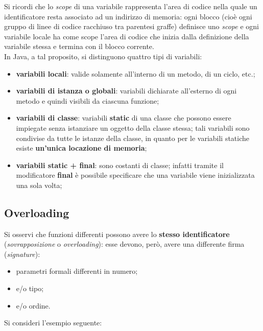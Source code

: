 \documentclass[a4paper]{extarticle}
\begin{document}
\vspace{1em}
\noindent
Si ricordi che lo \emph{scope} di una variabile rappresenta l’area di codice nella quale un identificatore resta associato ad un indirizzo di memoria: ogni blocco (cioè ogni gruppo di linee di codice racchiuso tra parentesi graffe) definisce uno \emph{scope} e ogni variabile locale ha come scope l’area di codice che inizia dalla definizione della variabile stessa e termina con il blocco corrente.\\
In Java, a tal proposito, si distinguono quattro tipi di variabili:
\begin{itemize}
  \item \textbf{variabili locali}: valide solamente all’interno di un metodo, di un ciclo, etc.;
  \item \textbf{variabili di istanza o globali}: variabili dichiarate all’esterno di ogni metodo e quindi visibili da ciascuna funzione;
  \item \textbf{variabili di classe}: variabili \textbf{static} di una classe che possono essere impiegate senza istanziare un oggetto della classe stessa; tali variabili sono condivise da tutte le istanze della classe, in quanto per le variabili statiche esiste \textbf{un'unica locazione di memoria};
  \item \textbf{variabili static + final}: sono costanti di classe; infatti tramite il modificatore \textbf{final} è possibile specificare che una variabile viene inizializzata una sola volta;
\end{itemize}

\vspace{1em}
\subsection{Overloading}
Si osservi che funzioni differenti possono avere lo \textbf{stesso identificatore} (\emph{sovrapposizione} o \emph{overloading}): esse devono, però, avere una differente firma (\emph{signature}):
\begin{itemize}
  \item parametri formali differenti in numero;
  \item e/o tipo;
  \item e/o ordine.
\end{itemize}
Si consideri l'esempio seguente:
\end{document}
